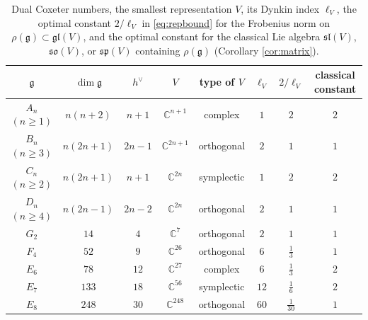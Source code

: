 \documentclass [leqno, 10pt]{amsart}
\theoremstyle{definition}
\numberwithin{equation}{section}
\newcommand{\so}{\mathfrak{so}}
\renewcommand{\sp}{\mathfrak{sp}}
\newcommand{\gl}{\mathfrak{gl}}
\newcommand{\sll}{\mathfrak{sl}}
\newcommand{\g}{\mathfrak{g}}
\newcommand{\com}{\mathbb C}
\newcommand{\hv}{h^\vee}
\begin{document}
\begin{table}[h]
\centering
\renewcommand{\arraystretch}{1.3}
\begin{tabular}{cccccccc}
\hline
$\g$ & $\dim\g$ & $\hv$ & $V$ & type of $V$ & $\ell_{V}$ & $2/\ell_{V}$ & classical constant\\
\hline
$A_n$ $(n\geq 1)$ & $n(n+2)$ & $n+1$ & $\com^{n+1}$ & complex & $1$ & $2$ & $2$ \\
$B_n$ $(n\geq 3)$ & $n(2n+1)$ & $2n-1$ & $\com^{2n+1}$ & orthogonal & $2$ & $1$ & $1$ \\
$C_n$ $(n\geq 2)$ & $n(2n+1)$ & $n+1$ & $\com^{2n}$ & symplectic & $1$ & $2$ & $2$ \\
$D_n$ $(n\geq 4)$ & $n(2n-1)$ & $2n-2$ & $\com^{2n}$ & orthogonal & $2$ & $1$ & $1$ \\
$G_2$ & $14$ & $4$ & $\com^{7}$ & orthogonal & $2$ & $1$ & $1$ \\
$F_4$ & $52$ & $9$ & $\com^{26}$ & orthogonal & $6$ & $\tfrac{1}{3}$ & $1$ \\
$E_6$ & $78$ & $12$ & $\com^{27}$ & complex & $6$ & $\tfrac{1}{3}$ & $2$ \\
$E_7$ & $133$ & $18$ & $\com^{56}$ & symplectic & $12$ & $\tfrac{1}{6}$ & $2$ \\
$E_8$ & $248$ & $30$ & $\com^{248}$ & orthogonal & $60$ & $\tfrac{1}{30}$ & $1$ \\
\hline
\end{tabular}
\caption{Dual Coxeter numbers, the smallest representation $V$, its Dynkin index $\ell_{V}$, the optimal constant $2/\ell_{V}$ in \eqref{eq:repbound} for the Frobenius norm on $\rho(\g) \subset \gl(V)$, and the optimal constant for the classical Lie algebra $\sll(V)$, $\so(V)$, or $\sp(V)$ containing $\rho(\g)$ (Corollary \ref{cor:matrix}).}
\label{tab:improvement}
\end{table}
\end{document}

